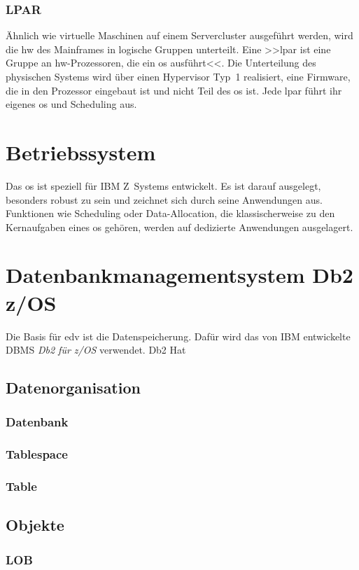 \subsubsection{LPAR}

Ähnlich wie virtuelle Maschinen auf einem Servercluster ausgeführt werden, wird die \ac{hw} des Mainframes in logische Gruppen unterteilt. Eine >>\ac{lpar} ist eine Gruppe an \ac{hw}-Prozessoren, die ein \ac{os} ausführt<<\cite{redbook.1}. Die Unterteilung des physischen Systems wird über einen Hypervisor Typ~1 realisiert, eine Firmware, die in den Prozessor eingebaut ist und nicht Teil des \ac{os} ist. Jede \ac{lpar} führt ihr eigenes \ac{os} und Scheduling aus.


\section[\z]{Betriebssystem \z}
Das \ac{os} \emph{\z} ist speziell für IBM Z~Systems entwickelt. Es ist darauf ausgelegt, besonders robust zu sein und zeichnet sich durch seine Anwendungen aus. Funktionen wie Scheduling oder Data-Allocation, die klassischerweise zu den Kernaufgaben eines \ac{os} gehören, werden auf dedizierte Anwendungen ausgelagert.



\section[Db2]{Datenbankmanagementsystem Db2 z/OS}
Die Basis für \ac{edv} ist die Datenspeicherung. Dafür wird das von IBM entwickelte DBMS \emph{Db2 für z/OS} verwendet. Db2 Hat

\subsection{Datenorganisation}


\subsubsection[\ac{db}]{Datenbank}


\subsubsection[\ac{ts}]{Tablespace}


\subsubsection[\ac{tb}]{Table}


\subsection{Objekte}

\subsubsection{LOB}